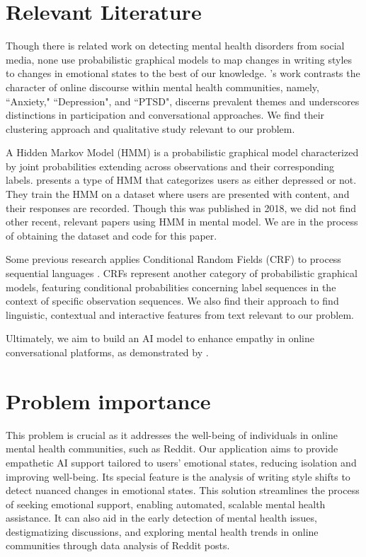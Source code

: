 \documentclass[conference,compsoc]{IEEEtran}
\begin{document}
\section{Relevant Literature}
Though there is related work on detecting mental health disorders from social media, none use probabilistic graphical models to map changes in writing styles to changes in emotional states to the best of our knowledge. \citet{Park+18:mental-health-reddit}'s work contrasts the character of online discourse within mental health communities, namely, ``Anxiety," ``Depression", and ``PTSD", discerns prevalent themes and underscores distinctions in participation and conversational approaches. We find their clustering approach and qualitative study relevant to our problem. 

A Hidden Markov Model (HMM) is a probabilistic graphical model characterized by joint probabilities extending across observations and their corresponding labels. \citet{Ansari+18:dcr-hmm} presents a type of HMM that categorizes users as either depressed or not. They train the HMM on a dataset where users are presented with content, and their responses are recorded. Though this was published in 2018, we did not find other recent, relevant papers using HMM in mental model. We are in the process of obtaining the dataset and code for this paper. 

Some previous research applies Conditional Random Fields (CRF) to process sequential languages \citep{Guo+20:opinion-holders, Zhang+Singh-19:attributed-oriented}. CRFs represent another category of probabilistic graphical models, featuring conditional probabilities concerning label sequences in the context of specific observation sequences. We also find their approach to find linguistic, contextual and interactive features from text relevant to our problem. 

Ultimately, we aim to build an AI model to enhance empathy in online conversational platforms, as demonstrated by \citet{Sharma+23:human-ai-empathic-conversation}.

\section{Problem importance}
This problem is crucial as it addresses the well-being of individuals in online mental health communities, such as Reddit. Our application aims to provide empathetic AI support tailored to users' emotional states, reducing isolation and improving well-being. Its special feature is the analysis of writing style shifts to detect nuanced changes in emotional states. This solution streamlines the process of seeking emotional support, enabling automated, scalable mental health assistance. It can also aid in the early detection of mental health issues, destigmatizing discussions, and exploring mental health trends in online communities through data analysis of Reddit posts.
\end{document}
